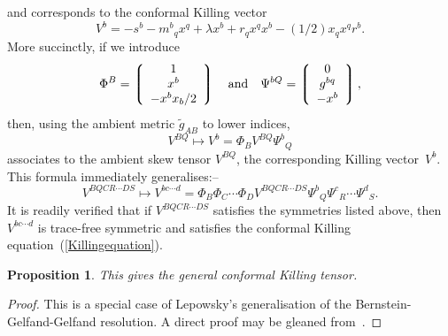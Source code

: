 \documentclass[a4paper,12pt]{amsart}
\newtheorem{prop}{Proposition}
\begin{document}
and corresponds to the conformal Killing vector
$$V^b=-s^b-m^b{}_qx^q+\lambda x^b+r_qx^qx^b-(1/2)x_qx^qr^b.$$
More succinctly, if we introduce
$$\Phi^B=\left\lgroup\begin{array}c1\\ x^b\\ -x^bx_b/2\end{array}\right\rgroup
\quad\mbox{and}\quad
\Psi^{bQ}=\left\lgroup\begin{array}c0\\ g^{bq}\\ -x^b\end{array}\right\rgroup,
$$
then, using the ambient metric $\widetilde g_{AB}$ to lower indices,
$$V^{BQ}\mapsto V^b=\Phi_BV^{BQ}\Psi^b{}_Q$$
associates to the ambient skew tensor $V^{BQ}$, the corresponding Killing
vector~$V^b$. This formula immediately generalises:--
$$V^{BQCR\cdots DS}\mapsto V^{bc\cdots d}=\Phi_B\Phi_C\cdots\Phi_D
  V^{BQCR\cdots DS}\Psi^b{}_Q\Psi^c{}_R\cdots\Psi^d{}_S.$$
It is readily verified that if $V^{BQCR\cdots DS}$ satisfies the
symmetries listed above, then $V^{bc\cdots d}$ is trace-free symmetric and
satisfies the conformal Killing equation~(\ref{Killingequation}).
\begin{prop}\label{generalsolution}
This gives the general conformal Killing tensor.\end{prop}
\begin{proof} This is a special case of Lepowsky's generalisation \cite{l} of
the Bernstein-Gelfand-Gelfand resolution. A direct proof may be gleaned
from~\cite{g}. \end{proof}
\end{document}
